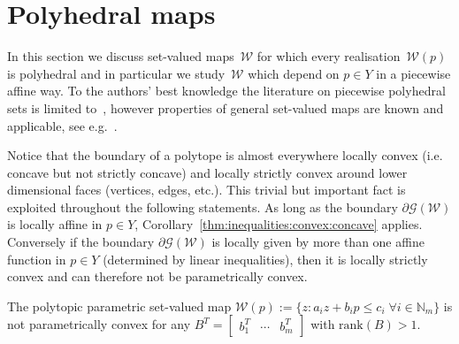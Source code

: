 \documentclass[smallextended]{svjour3}       %
\numberwithin{equation}{section}
\begin{document}
\section{Polyhedral maps}\label{sec:polyhedral:maps}
%
%
%
%
In this section we discuss set-valued maps~$\mathcal W$ for which every realisation~$\mathcal W(p)$ is polyhedral and in particular we study~$\mathcal W$ which depend on $p\in Y$ in a piecewise affine way. 
%
To the authors' best knowledge the literature on piecewise polyhedral sets is limited to~\cite{Finzel:2000}, however properties of general set-valued maps are known and applicable, see e.g.~\cite{Aubin:2009}.
%
\begin{remark}
%
Notice that the boundary of a polytope is almost everywhere locally convex (i.e. concave but not strictly concave) and locally strictly convex around lower dimensional faces (vertices, edges, etc.).
%
This trivial but important fact is exploited throughout the following statements. 
%
As long as the boundary $\partial\mathscr G(\mathcal W)$ is locally affine in $p\in Y$, Corollary~\ref{thm:inequalities:convex:concave} applies. 
%
Conversely if the boundary $\partial\mathscr G(\mathcal W)$ is locally given by more than one affine function in $p\in Y$ (determined by linear inequalities), then it is locally strictly convex and can therefore not be parametrically convex.
\end{remark}
%
\begin{corollary}\label{thm:polytopic:set:not:p:convex}
The polytopic parametric set-valued map $\mathcal W(p):=\{z: a_i z + b_i p\leq c_i \; \forall i\in\mathbb N_m\}$
is not parametrically convex for any $B^T = [\begin{matrix} b_1^T & \cdots & b_m^T\end{matrix}]$ with $\text{rank}(B)>1$.
\end{corollary}
%
\end{document}
